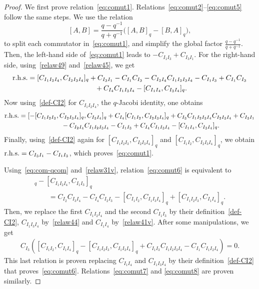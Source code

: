 \documentclass[pdftex]{sigma}
\numberwithin{equation}{section}
\theoremstyle{definition}
\begin{document}
\begin{proof}
We first prove relation~\eqref{eq:comut1}. Relations~\eqref{eq:comut2}--\eqref{eq:comut5} follow the same steps.
We use the relation
\begin{equation}\label{eq:com-qcom}
[A,B] = \frac{q-q^{-1}}{q+q^{-1}} \big( [A , B]_q -[B , A]_q\big) ,
\end{equation}
to split each commutator in~\eqref{eq:comut1}, and simplify the global factor $\frac{q-q^{-1}}{q+q^{-1}}$.
Then, the left-hand side of~\eqref{eq:comut1} leads to $-C_{I_1I_3}+C_{I_3I_1}$. For the right-hand side, using~\eqref{relaw49} and~\eqref{relaw45}, we get
\begin{gather*}
{\rm r.h.s.}= [C_{I_1I_2I_4},C_{I_2I_3I_4} ]_q +C_{I_3I_1} -C_{I_1}C_{I_3}- C_{I_2I_4}C_{I_1I_2I_3I_4}
 -C_{I_1I_3}+C_{I_1}C_{I_3} \\
\hphantom{{\rm r.h.s.}=}{}+C_{I_4}C_{I_1I_3I_4}-[C_{I_1I_4} ,C_{I_3I_4}]_q.
\end{gather*}
Now using~\eqref{def-CI2} for $C_{I_1I_2I_4}$, the $q$-Jacobi identity, one obtains
 \begin{gather*}
{\rm r.h.s.}= [-[C_{I_1I_2I_3},C_{I_2I_3I_4} ]_q,C_{I_3I_4} ]_q +C_{I_4}[C_{I_1I_2},C_{I_2I_3I_4}]_q+C_{I_3}C_{I_1I_2I_3I_4}C_{I_2I_3I_4}+C_{I_3I_1}\\
\hphantom{{\rm r.h.s.}=}{} - C_{I_2I_4}C_{I_1I_2I_3I_4}
 -C_{I_1I_3}+C_{I_4}C_{I_1I_3I_4}
-[C_{I_1I_4} ,C_{I_3I_4}]_q.
 \end{gather*}
Finally, using~\eqref{def-CI2} again for $[C_{I_1I_2I_3},C_{I_2I_3I_4} ]_q$ and $[C_{I_1I_2},C_{I_2I_3I_4}]_q$, we obtain ${\rm r.h.s.}=C_{I_3I_1} -C_{I_1I_3}$, which proves~\eqref{eq:comut1}.

Using~\eqref{eq:com-qcom} and~\eqref{relaw31v}, relation~\eqref{eq:comut6} is equivalent to
\begin{gather*}
[C_{I_1I_3}, C_{I_1I_2I_4} ]_q - [C_{I_1I_2I_4},C_{I_1I_3} ]_q\\
\qquad= C_{I_2}C_{I_3I_4} - C_{I_4}C_{I_2I_3}
-[C_{I_1I_2},C_{I_1I_3I_4}]_q+[C_{I_1I_2I_3},C_{I_1I_4}]_q.
 \end{gather*}
Then, we replace the first $C_{I_1I_2I_4}$ and the second $C_{I_1I_3}$ by their definition~\eqref{def-CI2},
$C_{I_1I_3I_4}$ by~\eqref{relaw44} and $C_{I_1I_4}$ by~\eqref{relaw41v}. After some manipulations, we get
\begin{gather*}
C_{I_3}( [C_{I_1I_2},C_{I_1I_4} ]_q -[C_{I_1I_2I_3},C_{I_1I_3I_4}]_q
+ C_{I_1I_3}C_{I_1I_2I_3I_4} - C_{I_1}C_{I_1I_2I_4})=0.
 \end{gather*}
This last relation is proven replacing $C_{I_1I_4}$ and $C_{I_1I_3I_4}$ by their definition~\eqref{def-CI2} that proves~\eqref{eq:comut6}.
Relations~\eqref{eq:comut7} and \eqref{eq:comut8} are proven similarly.
\end{proof}
\end{document}
